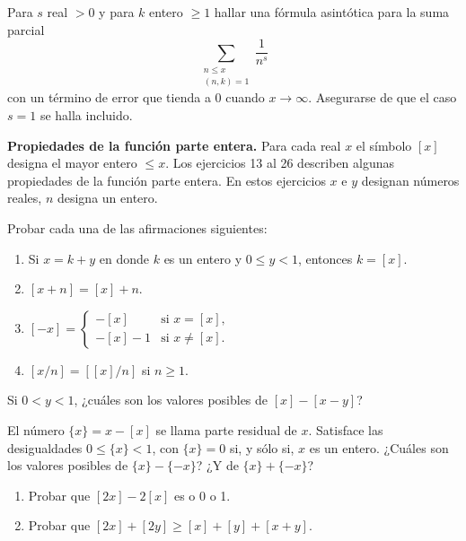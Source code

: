 \documentclass[12pt,a4paper]{book}
\begin{document}
    \begin{ejercicio}
        Para $s$ real $>0$ y para $k$ entero $\geq1$ hallar una fórmula asintótica para
        la suma parcial
        \begin{equation*}
            \sum_{\substack{n\leq x\\ (n,k)=1}}\frac{1}{n^s}
        \end{equation*}
        con un término de error que tienda a 0 cuando $x\to\infty$. Asegurarse de que el
        caso $s=1$ se halla incluido.
    \end{ejercicio}

    \textbf{Propiedades de la función parte entera.} Para cada real $x$ el símbolo $[x]$
    designa el mayor entero $\leq x$. Los ejercicios 13 al 26 describen algunas
    propiedades de la función parte entera. En estos ejercicios $x$ e $y$ designan números
    reales, $n$ designa un entero.

    \begin{ejercicio}
        Probar cada una de las afirmaciones siguientes:
        \begin{enumerate}
            \item[(a)] Si $x=k+y$ en donde $k$ es un entero y $0\leq y<1$, entonces
            $k=[x]$.
            \item[(b)] $[x+n]=[x]+n$.
            \item[(c)] $[-x]=\begin{cases}-[x] & \text{si } x=[x],\\
            -[x]-1 & \text{si } x\neq[x].\end{cases}$
            \item[(d)] $[x/n]=[[x]/n]$ si $n\geq1$.
        \end{enumerate}
    \end{ejercicio}

    \begin{ejercicio}
        Si $0<y<1$, ¿cuáles son los valores posibles de $[x]-[x-y]$?
    \end{ejercicio}

    \begin{ejercicio}
        El número $\{x\}=x-[x]$ se llama parte residual de $x$. Satisface las
        desigualdades $0\leq\{x\}<1$, con $\{x\}=0$ si, y sólo si, $x$ es un entero.
        ¿Cuáles son los valores posibles de $\{x\}-\{-x\}$? ¿Y de $\{x\}+\{-x\}$?
    \end{ejercicio}

    \begin{ejercicio}
        \begin{enumerate}
            \item[(a)] Probar que $[2x]-2[x]$ es o 0 o 1.
            \item[(b)] Probar que $[2x]+[2y]\geq[x]+[y]+[x+y]$.
        \end{enumerate}
    \end{ejercicio}
\end{document}
